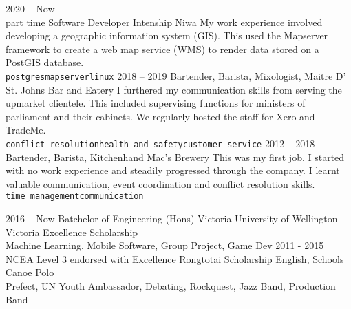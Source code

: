 \documentclass[9pt]{developercv} %
\begin{document}
\begin{entrylist}
	\entry
		{2020 -- Now\\\footnotesize{part time}}
		{Software Developer Intenship}
		{Niwa}
		{
			My work experience involved developing a geographic information system (GIS). This used the Mapserver framework to create a web map service (WMS) to render data stored on a PostGIS database.
			\\
			\texttt{postgres}\slashsep\texttt{mapserver}\slashsep\texttt{linux}
		}
	\entry
		{2018 -- 2019}
		{Bartender, Barista, Mixologist, Maitre D'}
		{St. Johns Bar and Eatery}
		{
			I furthered my communication skills from serving the upmarket clientele. This included supervising functions for ministers of parliament and their cabinets. We regularly hosted the staff for Xero and TradeMe.
			\\
			\texttt{conflict resolution}\slashsep\texttt{health and safety}\slashsep\texttt{customer service}
		}
	\entry
		{2012 -- 2018}
		{Bartender, Barista, Kitchenhand}
		{Mac's Brewery}
		{
			This was my first job. I started with no work experience and steadily progressed through the company. I learnt valuable communication, event coordination and conflict resolution skills.
			\\
			\texttt{time management}\slashsep\texttt{communication}
		}
\end{entrylist}



\begin{entrylist}
	\entry
		{2016 -- Now}
		{Batchelor of Engineering (Hons)}
		{Victoria University of Wellington}
		{
			Victoria Excellence Scholarship \\
			Machine Learning, Mobile Software, Group Project, Game Dev
		}
	\entry
		{2011 - 2015}
		{NCEA Level 3 endorsed with Excellence}
		{Rongtotai}
		{
			Scholarship English, Schools Canoe Polo \\
			Prefect, UN Youth Ambassador, Debating, Rockquest, Jazz Band, Production Band
		}
\end{entrylist}

\end{document}
